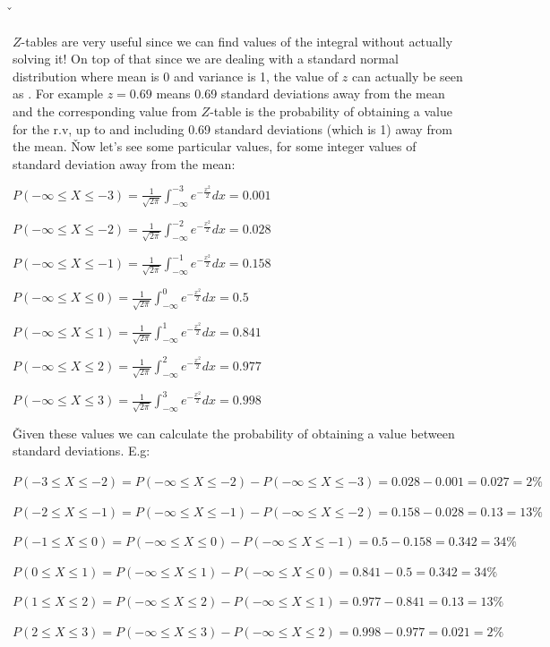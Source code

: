 \v

$Z$-tables are very useful since we can find values of the integral without actually solving it! On top of that since
we are dealing with a standard normal distribution where mean is 0 and variance is 1, the value of $z$ can actually
be seen as . For example $z=0.69$ means 0.69 standard deviations away
from the mean and the corresponding value from $Z$-table is the probability of obtaining a value for the r.v, up to
and including 0.69 standard deviations (which is 1) away from the mean. \v

Now let's see some particular values, for some integer values of standard deviation away from the mean:
\bit
\item $P(-\infty \leq X \leq -3) = \frac{1}{\sqrt{2\pi}} \int_{-\infty}^{-3} e^{-\frac{x^2}{2}} dx = 0.001$
\item $P(-\infty \leq X \leq -2) = \frac{1}{\sqrt{2\pi}} \int_{-\infty}^{-2} e^{-\frac{x^2}{2}} dx = 0.028$
\item $P(-\infty \leq X \leq -1) = \frac{1}{\sqrt{2\pi}} \int_{-\infty}^{-1} e^{-\frac{x^2}{2}} dx = 0.158$
\item $P(-\infty \leq X \leq 0) = \frac{1}{\sqrt{2\pi}} \int_{-\infty}^{0} e^{-\frac{x^2}{2}} dx = 0.5$
\item $P(-\infty \leq X \leq 1) = \frac{1}{\sqrt{2\pi}} \int_{-\infty}^{1} e^{-\frac{x^2}{2}} dx = 0.841$
\item $P(-\infty \leq X \leq 2) = \frac{1}{\sqrt{2\pi}} \int_{-\infty}^{2} e^{-\frac{x^2}{2}} dx = 0.977$
\item $P(-\infty \leq X \leq 3) = \frac{1}{\sqrt{2\pi}} \int_{-\infty}^{3} e^{-\frac{x^2}{2}} dx = 0.998$
\eit

\v

Given these values we can calculate the probability of obtaining a value between standard deviations. E.g:
\bit
\item $P(-3 \leq X \leq -2) = P(-\infty \leq X \leq -2) - P(-\infty \leq X \leq -3) = 0.028 - 0.001 = 0.027 = 2\%$
\item $P(-2 \leq X \leq -1) = P(-\infty \leq X \leq -1) - P(-\infty \leq X \leq -2) = 0.158 - 0.028 = 0.13 = 13\%$
\item $P(-1 \leq X \leq 0) = P(-\infty \leq X \leq 0) - P(-\infty \leq X \leq -1) = 0.5 - 0.158 = 0.342 = 34\%$
\item $P(0 \leq X \leq 1) = P(-\infty \leq X \leq 1) - P(-\infty \leq X \leq 0) = 0.841 - 0.5 = 0.342 = 34\%$
\item $P(1 \leq X \leq 2) = P(-\infty \leq X \leq 2) - P(-\infty \leq X \leq 1) = 0.977 - 0.841 = 0.13 = 13\%$
\item $P(2 \leq X \leq 3) = P(-\infty \leq X \leq 3) - P(-\infty \leq X \leq 2) = 0.998 - 0.977 = 0.021 = 2\%$
\eit

